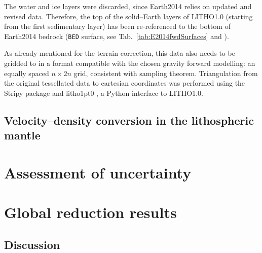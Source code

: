 The water and ice layers were discarded, since {Earth2014} \parencite{Hirt2015} relies on updated and revised data.
Therefore, the top of the solid--Earth layers of {LITHO1.0} (starting from the first sedimentary layer) has been re-referenced to the bottom of {Earth2014} bedrock (\texttt{BED} surface, see Tab.~\ref{tab:E2014fwdSurfaces} and \cite{Hirt2015_Earth2014readme}).

As already mentioned for the terrain correction, this data also needs to be gridded to in a format compatible with the chosen gravity forward modelling: an equally spaced $n \times 2n$ grid, consistent with \textcite{Driscoll1994} sampling theorem.
Triangulation from the original tessellated data to cartesian coordinates was performed using the {Stripy} package \parencites{Moresi2019}{Moresi2019_zenodo} and {litho1pt0} \parencite{Moresi2019_litho1pt0}, a Python interface to {LITHO1.0}.

\subsection{Velocity--density conversion in the lithospheric mantle}
\label{ss:SigIs:InModels:SCLM}



\newpage %
\section{Assessment of uncertainty}
\label{s:SigIs:Impl}





\section{Global reduction results}
\label{s:SigIs:Results}

\subsection{Discussion}
\label{ss:SigIs:Results:Discussion}

